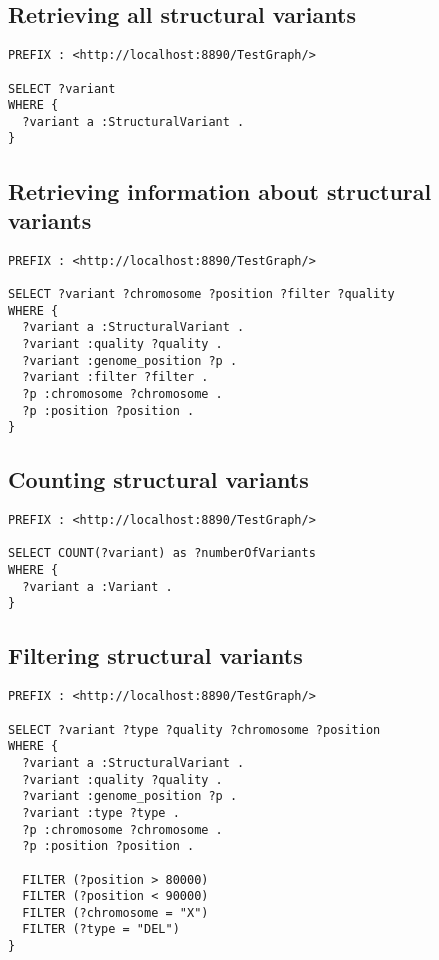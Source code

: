 \documentclass[11pt,a4paper,oneside]{book}
\begin{document}
\subsection{Retrieving all structural variants}
\begin{siderules}
\begin{verbatim}
PREFIX : <http://localhost:8890/TestGraph/>

SELECT ?variant
WHERE {
  ?variant a :StructuralVariant .
}
\end{verbatim} 
\end{siderules}

\subsection{Retrieving information about structural variants}
\label{sec:sparqling-svs}

\begin{siderules}
\begin{verbatim}
PREFIX : <http://localhost:8890/TestGraph/>

SELECT ?variant ?chromosome ?position ?filter ?quality
WHERE {
  ?variant a :StructuralVariant .
  ?variant :quality ?quality .
  ?variant :genome_position ?p .
  ?variant :filter ?filter .
  ?p :chromosome ?chromosome .
  ?p :position ?position .
}
\end{verbatim}
\end{siderules}

\subsection{Counting structural variants}

\begin{siderules}
\begin{verbatim}
PREFIX : <http://localhost:8890/TestGraph/>

SELECT COUNT(?variant) as ?numberOfVariants
WHERE {
  ?variant a :Variant .
}
\end{verbatim}
\end{siderules}

\subsection{Filtering structural variants}

\begin{siderules}
\begin{verbatim}
PREFIX : <http://localhost:8890/TestGraph/>

SELECT ?variant ?type ?quality ?chromosome ?position
WHERE {
  ?variant a :StructuralVariant .
  ?variant :quality ?quality .
  ?variant :genome_position ?p .
  ?variant :type ?type .
  ?p :chromosome ?chromosome .
  ?p :position ?position .

  FILTER (?position > 80000)
  FILTER (?position < 90000)
  FILTER (?chromosome = "X")
  FILTER (?type = "DEL")
}
\end{verbatim}
\end{siderules}
\end{document}
